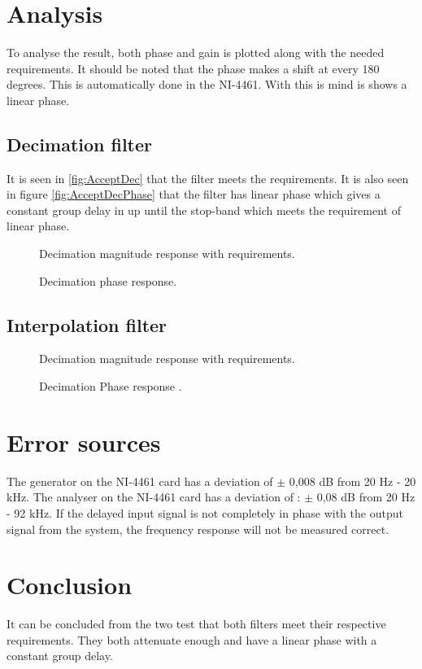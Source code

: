 \section{Analysis}
To analyse the result, both phase and gain is plotted along with the needed requirements. It should be noted that the phase makes a shift at every 180 degrees. This is automatically done in the NI-4461. With this is mind is shows a linear phase.

\subsection*{Decimation filter}
It is seen in \autoref{fig:AcceptDec} that the filter meets the requirements. It is also seen in figure \autoref{fig:AcceptDecPhase} that the filter has linear phase which gives a constant group delay in up until the stop-band which meets the requirement of linear phase. 
\begin{figure}[H]
	\centering
	
	\caption{Decimation magnitude response with requirements.}
	\label{fig:acceptDecMag}
\end{figure}
\begin{figure}[H]
	\centering
	
	\caption{Decimation phase response.}
	\label{fig:AcceptDecPhase}
\end{figure}


\subsection*{Interpolation filter}

\begin{figure}[H]
	\centering
	
	\caption{Decimation magnitude response with requirements.}
	\label{fig:acceptIntMag}
\end{figure}
\begin{figure}[H]
	\centering
	
	\caption{Decimation Phase response .}
	\label{fig:AcceptIntPhase}
\end{figure}

\section{Error sources}
The generator on the NI-4461 card has a deviation of $\pm$ 0,008 dB from 20 Hz - 20 kHz. The analyser on the NI-4461 card has a deviation of : $\pm$ 0,08 dB from 20 Hz - 92 kHz. If the delayed input signal is not completely in phase with the output signal from the system, the frequency response will not be measured correct.

\section{Conclusion}
It can be concluded from the two test that both filters meet their respective requirements. They both attenuate enough and have a linear phase with a constant group delay.